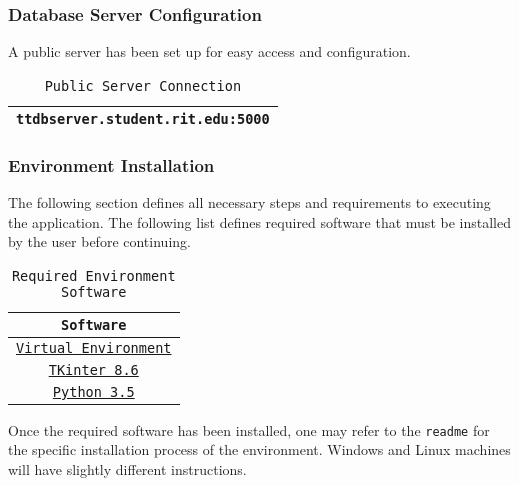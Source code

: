 \documentclass[11pt]{article}
\begin{document}
            \subsubsection{Database Server Configuration}
                A public server has been set up for easy access and configuration.
                \newline
                \begin{table*}[!hp]
                    \centering
                    \begin{tabulary}{\textwidth}{|c|}
                        \hline
                        \texttt{ttdbserver.student.rit.edu:5000}\\
                        \hline
                    \end{tabulary}
                    \caption{\texttt{Public Server Connection}}
                \end{table*}
            \subsubsection{Environment Installation}
                The following section defines all necessary steps and requirements to executing the application.
                \newline
                The following list defines required software that must be installed by the user before continuing.
                \begin{table*}[!hp]
                    \centering
                    \begin{tabulary}{\textwidth}{|c|}
                        \hline
                        \texttt{Software}\\
                        \hline
                        \texttt{\href{https://virtualenv.pypa.io/en/stable/installation/}{Virtual Environment}}\\
                        \hline
                        \texttt{\href{https://docs.python.org/3/library/tkinter.html}{TKinter 8.6}}\\
                        \hline
                        \texttt{\href{https://www.python.org/downloads/release/python-350/}{Python 3.5}}\\
                        \hline
                    \end{tabulary}
                    \caption{\texttt{Required Environment Software}}
                \end{table*}
                \newline
                Once the required software has been installed, one may refer to the \texttt{readme} for the specific installation process of the environment. Windows and Linux machines will have slightly different instructions.
\end{document}
